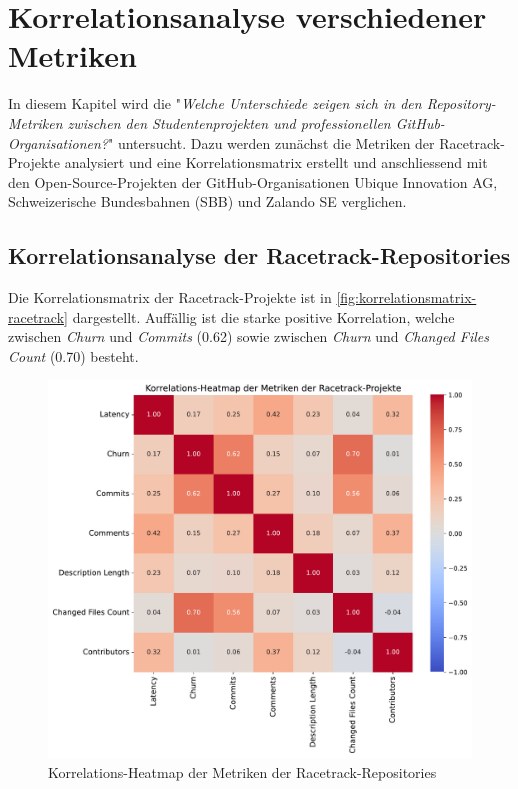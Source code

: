 \section{Korrelationsanalyse verschiedener Metriken}
\label{sec:Korrelationsanalyse}
In diesem Kapitel wird die  "\textit{Welche Unterschiede zeigen sich in den Repository-Metriken
zwischen den Studentenprojekten und professionellen GitHub-Organisationen?}" untersucht. Dazu werden zunächst die Metriken der Racetrack-Projekte analysiert und eine Korrelationsmatrix erstellt und anschliessend mit den Open-Source-Projekten der GitHub-Organisationen Ubique Innovation AG, Schweizerische Bundesbahnen (SBB) und Zalando SE verglichen.
\subsection{Korrelationsanalyse der Racetrack-Repositories}
Die Korrelationsmatrix der Racetrack-Projekte ist in \autoref{fig:korrelationsmatrix-racetrack} dargestellt. Auffällig ist die starke positive Korrelation, welche zwischen \textit{Churn} und \textit{Commits} (0.62) sowie zwischen \textit{Churn} und \textit{Changed Files Count} (0.70) besteht. 

\begin{figure}[htbp]
    \includegraphics[width=\textwidth]{Figures/racetrack-korrelationsmatrix.pdf}
    \caption{Korrelations-Heatmap der Metriken der Racetrack-Repositories}
    \label{fig:korrelationsmatrix-racetrack}
\end{figure}


